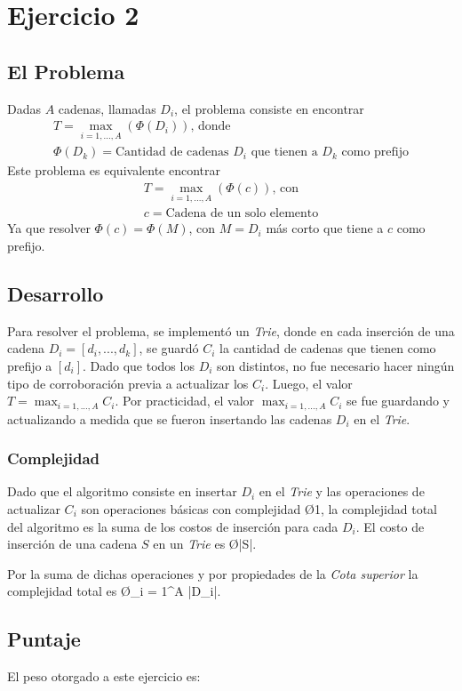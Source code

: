 \section{Ejercicio 2}
\subsection{El Problema}
Dadas $A$ cadenas, llamadas $D_i$, el problema consiste en encontrar 
\begin{gather*}
T = \operatorname*{max}_{i = 1,...,A} (\Phi(D_i))\text{, donde}\\
\Phi(D_k) = \text{Cantidad de cadenas $D_i$ que tienen a $D_k$ como prefijo}
\end{gather*}
Este problema es equivalente encontrar 
\begin{gather*}
T = \operatorname*{max}_{i = 1,...,A} (\Phi(c))\text{, con}\\
c = \text{Cadena de un solo elemento}
\end{gather*}
Ya que resolver $\Phi(c) = \Phi(M)$, con $M = D_i$ más corto que tiene a $c$ como prefijo.

\subsection{Desarrollo}
Para resolver el problema, se implementó un \emph{Trie}, donde en cada inserción de una cadena $D_i = [d_i,...,d_k]$, se guardó $C_i$ la cantidad de cadenas que tienen como prefijo a $[d_i]$. Dado que todos los $D_i$ son distintos, no fue necesario hacer ningún tipo de corroboración previa a actualizar los $C_i$.
Luego, el valor $\displaystyle T = \operatorname*{max}_{i = 1,...,A} C_i$. Por practicidad, el valor $\operatorname*{max}_{i = 1,...,A} C_i$ se fue guardando y actualizando a medida que se fueron insertando las cadenas $D_i$ en el \emph{Trie}.

\subsubsection{Complejidad}
Dado que el algoritmo consiste en insertar $D_i$ en el \emph{Trie} y las operaciones de actualizar $C_i$ son operaciones básicas con complejidad \O{1}, la complejidad total del algoritmo es la suma de los costos de inserción para cada $D_i$.
El costo de inserción de una cadena $S$ en un \emph{Trie} es \O{|S|}.

Por la suma de dichas operaciones y por propiedades de la \emph{Cota superior} la complejidad total es \O{\displaystyle \sum_{i = 1}^{A} |D_i|}.

\subsection{Puntaje}
El peso otorgado a este ejercicio es:
